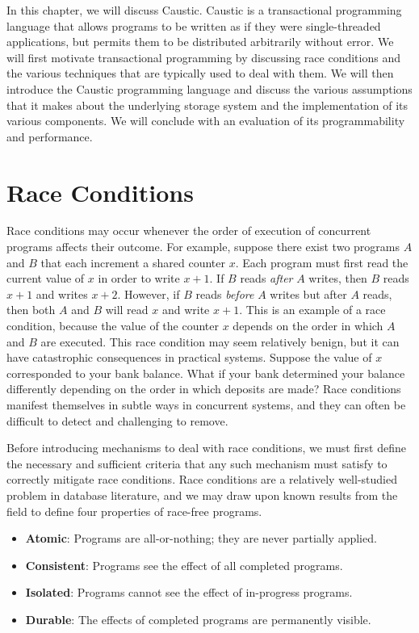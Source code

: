 \documentclass[../main.tex]{subfiles}
\begin{document}
In this chapter, we will discuss Caustic. Caustic is a transactional programming language that
allows programs to be written as if they were single-threaded applications, but permits them to be
distributed arbitrarily without error. We will first motivate transactional programming by
discussing race conditions and the various techniques that are typically used to deal with them. We
will then introduce the Caustic programming language and discuss the various assumptions that it
makes about the underlying storage system and the implementation of its various components. We will
conclude with an evaluation of its programmability and performance.

\section{Race Conditions}
Race conditions may occur whenever the order of execution of concurrent programs affects their
outcome. For example, suppose there exist two programs $A$ and $B$ that each increment a shared
counter $x$. Each program must first read the current value of $x$ in order to write $x + 1$. If
$B$ reads \emph{after} $A$ writes, then $B$ reads $x + 1$ and writes $x + 2$. However, if $B$ reads
\emph{before} $A$ writes but after $A$ reads, then both $A$ and $B$ will read $x$ and write $x + 1$.
This is an example of a race condition, because the value of the counter $x$ depends on the order in
which $A$ and $B$ are executed. This race condition may seem relatively benign, but it can have
catastrophic consequences in practical systems. Suppose the value of $x$ corresponded to your bank
balance. What if your bank determined your balance differently depending on the order in which
deposits are made? Race conditions manifest themselves in subtle ways in concurrent systems, and
they can often be difficult to detect and challenging to remove.

Before introducing mechanisms to deal with race conditions, we must first define the necessary and
sufficient criteria that any such mechanism must satisfy to correctly mitigate race conditions.
Race conditions are a relatively well-studied problem in database literature, and we may draw upon
known results from the field to define four properties of race-free programs.~\cite{transactions}

\begin{itemize}
\item \textbf{Atomic}: Programs are all-or-nothing; they are never partially applied.
\item \textbf{Consistent}: Programs see the effect of all completed programs.
\item \textbf{Isolated}: Programs cannot see the effect of in-progress programs.
\item \textbf{Durable}: The effects of completed programs are permanently visible.
\end{itemize}
\end{document}
